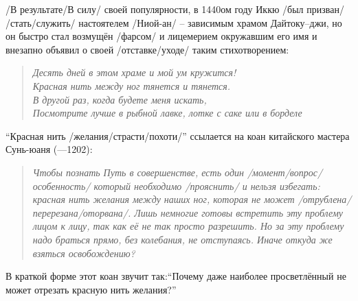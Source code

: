 \begin{ver}
  /В результате/В силу/ своей популярности,  в 1440ом году Иккю /был
  призван/ /стать/служить/ настоятелем /Ниой-ан/ --
  зависимым храмом Дайтоку--джи, но он быстро стал возмущён /фарсом/ и
  лицемерием окружавшим его имя и внезапно объявил о своей
  /отставке/уходе/ таким стихотворением:
\end{ver}
\begin{ver}
  \begin{verse}\it
    Десять дней в этом храме и мой ум кружится!\\
    Красная нить между ног тянется и тянется.\\
    В другой раз, когда будете меня искать,\\
    Посмотрите лучше в рыбной лавке, лотке с саке или в борделе
  \end{verse}
\end{ver}

\begin{ver}
  ``Красная нить /желания/страсти/похоти/'' ссылается на коан
  китайского мастера Сунь-юаня (---1202): 
\end{ver}

\begin{ver}
  \begin{quote}\it
    Чтобы познать Путь в совершенстве, есть один
    /момент/вопрос/особенность/ который необходимо
    /прояснить/ и нельзя избегать: красная нить
    желания между наших ног, которая не может
    /отрублена/перерезана/оторвана/.
    Лишь немногие готовы встретить эту проблему лицом к лицу, так как её не так просто разрешить.
    Но за эту проблему надо браться прямо, без колебания, не
    отступаясь. Иначе откуда же взяться освобождению?
  \end{quote}
\end{ver}

\begin{ver}
  В краткой форме этот коан звучит так:``Почему даже наиболее
  просветлённый не может отрезать красную нить желания?''
\end{ver}
